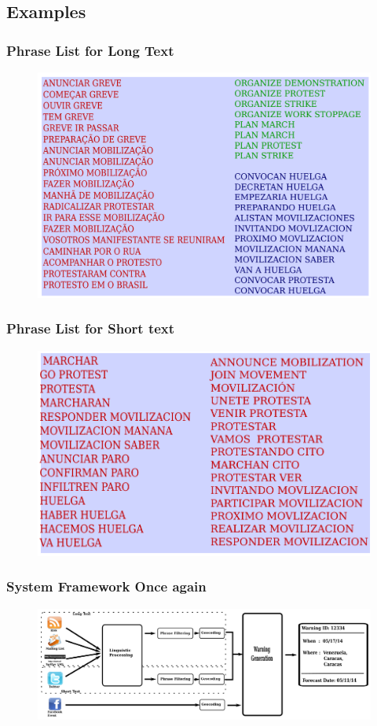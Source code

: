 \documentclass[red]{beamer}
\begin{document}
\subsection{Examples}
\begin{frame}
    \frametitle{Phrase List for Long Text}
    \begin{figure}
        \includegraphics[scale=0.5]{wordlist_rss}
    \end{figure}
\end{frame}


\begin{frame}
    \frametitle{Phrase List for Short text}
     \begin{figure}
        \includegraphics[scale=0.5]{wordlist_twitter}
     \end{figure}
\end{frame}


\begin{frame}
    \frametitle{System Framework Once again}
    \begin{figure}
        \centering
        \includegraphics[height=0.6\textheight,width=\textwidth]{pipeline}
    \end{figure}
\end{frame}
\end{document}

